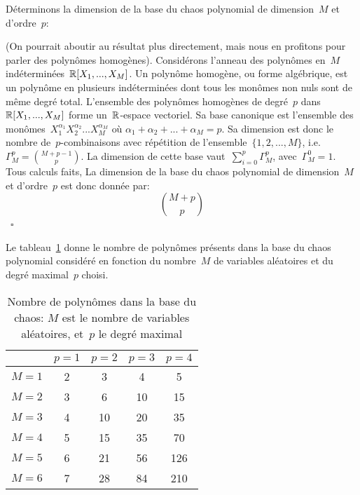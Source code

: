 \medskip
Déterminons la dimension de la base du chaos polynomial de dimension~$M$ et d'ordre~$p$:
\begin{demonstration}\footnotesize{}
(On pourrait aboutir au résultat plus directement, mais nous en profitons pour parler des polynômes homogènes).
Considérons l'anneau des polynômes en~$M$ indéterminées~$\mathbb R[X_1, ..., X_M]$.
Un polynôme homogène, ou forme algébrique, est un polynôme en plusieurs indéterminées dont tous les monômes non nuls sont de même degré total.
L'ensemble des polynômes homogènes de degré~$p$ dans~$\mathbb R[X_1, ..., X_M]$ forme un~$\mathbb R$-espace vectoriel.
Sa base canonique est l'ensemble des monômes~$X_1^{\alpha_1}X_2^{\alpha_2}...X_M^{\alpha_M} \text{ où } \alpha_1+\alpha_2+...+\alpha_M=p$.
Sa dimension est donc le nombre de~$p$-combinaisons avec répétition de l'ensemble~$\{1, 2, ..., M\}$, i.e.~$\Gamma_M^p={M+p-1\choose p}$.
La dimension de cette base vaut~$\sum_{i=0}^p \Gamma_M^p$, avec~$\Gamma_M^0=1$.\normalsize{} \\
Tous calculs faits, La dimension de la base du chaos polynomial de dimension~$M$ et d'ordre~$p$ est donc donnée par:
\begin{equation}
{M+p\choose p}
\end{equation}\footnotesize{}~$\square$
\end{demonstration}
Le tableau~\ref{Tab-NbChaos} donne le nombre de polynômes présents dans la base du chaos polynomial considéré en fonction du nombre~$M$ de variables aléatoires et du degré maximal~$p$ choisi.
\begin{table}[htb]
\begin{center}
\begin{tabular}{c|cccc}
& $p=1$ & $p=2$ & $p=3$ & $p=4$\\
\hline
$M=1$ &2&3&4&5\\
$M=2$ &3&6&10&15\\
$M=3$ &4&10&20&35\\
$M=4$ &5&15&35&70\\
$M=5$ &6&21&56&126\\
$M=6$ &7&28&84&210
\end{tabular}
\end{center}
\caption{Nombre de polynômes dans la base du chaos: $M$ est le nombre de variables aléatoires, et~$p$ le degré maximal}\label{Tab-NbChaos}
\end{table}


